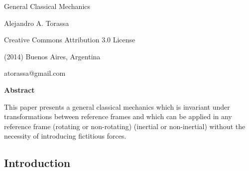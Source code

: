 \documentclass[10pt]{article}
\begin{document}
\begin{center}

{\huge General Classical Mechanics}

\bigskip \bigskip

{\large Alejandro A. Torassa}

\bigskip \bigskip

\small

Creative Commons Attribution 3.0 License

(2014) Buenos Aires, Argentina

atorassa@gmail.com

\bigskip \medskip

{\bf Abstract}

\bigskip

\parbox{96mm}{This paper presents a general classical mechanics which is invariant under transformations between reference frames and which can be applied in any reference frame (rotating or non-rotating) (inertial or non-inertial) without the necessity of introducing fictitious forces.}

\end{center}

\normalsize

\vspace{-0.30em}

{\centering\subsection*{Introduction}}

\vspace{+1.20em}
\end{document}
